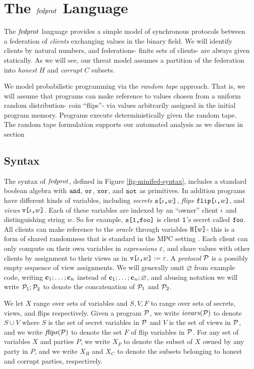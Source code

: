 \section{The $\mathit{fedprot}$ Language}

The $\mathit{fedprot}$ language provides a simple model of synchronous
protocols between a federation of \emph{clients} exchanging values in
the binary field. We will identify clients by natural numbers, and
federations- finite sets of clients- are always given statically.
As we will see, our threat model assumes a partition of the federation
into \emph{honest} $H$ and \emph{corrupt} $C$ subsets.

We model probabilistic programming via the \emph{random tape}
approach. That is, we will assume that programs can make reference to
values chosen from a uniform random distribution- coin ``flips''- via
values arbitrarily assigned in the initial program memory.  Programs
execute deterministically given the random tape. The random tape
formulation supports our automated analysis as we discuss in
section 

\subsection{Syntax} The syntax of $\mathit{fedprot}$, defined in
Figure \ref{fig-minifed-syntax}, includes a standard boolean algebra
with $\texttt{and}$, $\texttt{or}$, $\texttt{xor}$, and $\texttt{not}$ as primitives. In addition
programs have different kinds of variables, including \emph{secrets}
$\texttt{s[}\iota\texttt{,}w\texttt{]}$, \emph{flips} $\texttt{flip[}\iota\texttt{,}w\texttt{]}$, and \emph{views}
$\texttt{v[}\iota\texttt{,}w\texttt{]}$.  Each of these variables are indexed by an ``owner''
client $\iota$ and distinguishing string $w$. So for example,
$\texttt{s[}\texttt{1}\texttt{,}\texttt{foo}\texttt{]}$ is client $\texttt{1}$'s secret called
$\texttt{foo}$. All clients can make reference to the \emph{oracle}
through variables $\texttt{H[}w\texttt{]}$- this is a form of shared randomness
that is standard in the MPC setting \cite{XXX}.  Each client can only
compute on their own variables in \emph{expressions} $\varepsilon$, and share
values with other clients by assignment to their views as in
$\texttt{v[}\iota\texttt{,}w\texttt{]} := \varepsilon$.  A \emph{protocol} $\mathcal{P}$ is a
possibly empty sequence of view assignments. We will generally omit
$\varnothing$ from example code, writing $\mathbf{c}_1;\ldots;\mathbf{c}_n$
instead of $\mathbf{c}_1;\ldots;\mathbf{c}_n;\varnothing$, and abusing notation we will
write $\mathcal{P}_1;\mathcal{P}_2$ to denote the concatenation of $\mathcal{P}_1$
and $\mathcal{P}_2$.

We let $X$ range over sets of variables and $S,V,F$ to range over sets
of secrets, views, and flips respectively. Given a program $\mathcal{P}$, we
write $\mathit{iovars}(\mathcal{P})$ to denote $S \cup V$ where $S$ is the set of
secret variables in $\mathcal{P}$ and $V$ is the set of views in $\mathcal{P}$,
and we write $\mathit{flips}(\mathcal{P})$ to denote the set $F$ of flip variables
in $\mathcal{P}$. For any set of variables $X$ and parties $P$, we write
$X_P$ to denote the subset of $X$ owned by any party in $P$, and we
write $X_H$ and $X_C$ to denote the subsets belonging to honest and
corrupt parties, respectively.

